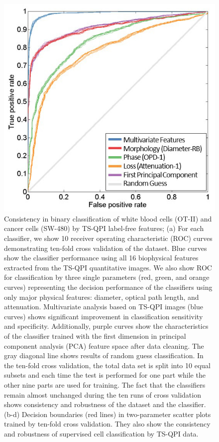 \documentclass[aps,pra,reprint,superscriptaddress]{revtex4-1}
\begin{document}
\begin{figure}
\includegraphics[scale=0.6]{FigureOTSWROC.jpg}
\caption{\label{fig:OTSWROC} Consistency in binary classification of white blood cells (OT-II) and cancer cells (SW-480) by TS-QPI label-free features; (a) For each classifier, we show 10 receiver operating characteristic (ROC) curves demonstrating ten-fold cross validation of the dataset. Blue curves show the classifier performance using all 16 biophysical features extracted from the TS-QPI quantitative images. We also show ROC for classification by three single parameters (red, green, and orange curves) representing the decision performance of the classifiers using only major physical features: diameter, optical path length, and attenuation. Multivariate analysis based on TS-QPI images (blue curves) shows significant improvement in classification sensitivity and specificity. Additionally, purple curves show the characteristics of the classifier trained with the first dimension in principal component analysis (PCA) feature space after data cleaning. The gray diagonal line shows results of random guess classification. In the ten-fold cross validation, the total data set is split into 10 equal subsets and each time the test is performed for one part while the other nine parts are used for training. The fact that the classifiers remain almost unchanged during the ten runs of cross validation shows consistency and robustness of the dataset and the classifier. (b-d) Decision boundaries (red lines) in two-parameter scatter plots trained by ten-fold cross validation. They also show the consistency and robustness of supervised cell classification by TS-QPI data.}
\end{figure}
\end{document}
